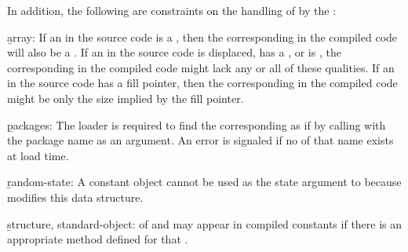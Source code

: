 In addition, the following are constraints on the handling of
 by the :
 
\beginlist

 \item{}\b{array:} If an  in the source code is a
, then the corresponding 
in the compiled code will also be a .  If
an  in the source code is displaced, has a 
, or is , the corresponding 
 in the compiled code might lack any or all of these
qualities. If an  in the source code has a fill
pointer, then the corresponding  in the compiled
code might be only the size implied by the fill pointer.

 \item{}\b{packages:} The loader is required to find the
corresponding   as if by calling 
 with the package name as an argument.  
An error  is signaled if no 
 of that name exists at load time.

 \item{}\b{random-state:} A constant 
object cannot be used as the state argument 
to  because  modifies this data structure.
 
\item{}\b{structure, standard-object:}
 of   and 
may appear in compiled constants if there is an
appropriate  method defined for that
.
 

